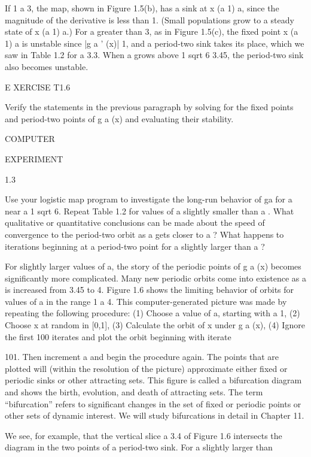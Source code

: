 \documentclass[12pt]{article}
\begin{document}
If 1  a  3, the map, shown in Figure 1.5(b), has a sink at x  (a  1)  a, since the magnitude of the 
derivative is less than 1. (Small populations grow to a steady state of x  (a  1)  a.) For a greater than 
3, as in Figure 1.5(c), the fixed point x  (a  1)  a is unstable since |g a ' (x)| 
 1, and a period-two sink takes its place, which we saw in Table 1.2 for a  3.3. When a grows above 1 sqrt 6  
3.45, the period-two sink also becomes unstable.

 

E XERCISE T1.6

Verify the statements in the previous paragraph by solving for the fixed points and period-two points of g 
a (x) and evaluating their stability.


COMPUTER

EXPERIMENT

1.3

Use your logistic map program to investigate the long-run behavior of ga  for a near a   1 sqrt 6. Repeat 
Table 1.2 for values of a slightly smaller than a  . What qualitative or quantitative conclusions can be 
made about the speed of convergence to the period-two orbit as a gets closer to a  ? What happens to 
iterations beginning at a period-two point for a slightly larger than a  ?

For slightly larger values of a, the story of the periodic points of g a (x) becomes significantly more 
complicated. Many new periodic orbits come into existence as a is increased from 3.45 to 4. Figure 1.6 
shows the limiting behavior of orbits for values of a in the range 1   a  4. This computer-generated 
picture was made by repeating the following procedure: (1) Choose a value of a, starting with a  1, (2) 
Choose x at random in [0,1], (3) Calculate the orbit of x under g a (x), (4) Ignore the first 100 iterates 
and plot the orbit beginning with iterate

101. Then increment a and begin the procedure again. The points that are plotted will (within the 
resolution of the picture) approximate either fixed or periodic sinks or other attracting sets. This figure 
is called a bifurcation diagram and shows the birth, evolution, and death of attracting sets. The term 
“bifurcation” refers to significant changes in the set of fixed or periodic points or other sets of dynamic 
interest. We will study bifurcations in detail in Chapter 11.

We see, for example, that the vertical slice a  3.4 of Figure 1.6 intersects the diagram in the two points 
of a period-two sink. For a slightly larger than
\end{document}
